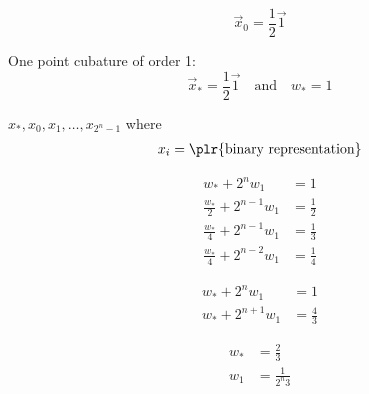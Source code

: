 \[
    \vec{x}_0 = \frac{1}{2} \vec{1}
\]

One point cubature of order 1:
\[
    \vec{x}_* = \frac{1}{2} \vec{1}
    \quad \text{and} \quad
    w_* = 1
\]

\( x_*, x_0, x_1, \ldots, x_{2^n-1} \) where
\begin{align*}
    x_i = \plr{\text{binary representation}}
\end{align*}

\begin{align*}
    w_* + 2^n w_1               & = 1
    \\
    \frac{w_*}{2} + 2^{n-1} w_1 & = \frac{1}{2}
    \\
    \frac{w_*}{4} + 2^{n-1} w_1 & = \frac{1}{3}
    \\
    \frac{w_*}{4} + 2^{n-2} w_1 & = \frac{1}{4}
\end{align*}

\begin{align*}
    w_* + 2^n w_1     & = 1
    \\
    w_* + 2^{n+1} w_1 & = \frac{4}{3}
\end{align*}

\begin{align*}
    w_* & = \frac{2}{3}
    \\
    w_1 & = \frac{1}{2^n 3}
\end{align*}
